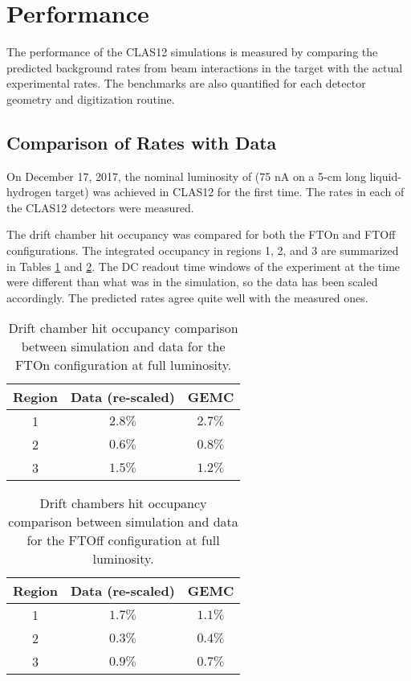 \section{Performance}

The performance of the CLAS12 simulations is measured by comparing the predicted background rates from beam interactions
in the target with the actual experimental rates. The benchmarks are also quantified for each detector geometry and digitization routine.

\subsection{Comparison of Rates with Data}
On December 17, 2017, the nominal luminosity of \cLuminosity
(75 nA on a 5-cm long liquid-hydrogen target) was achieved in CLAS12 for the first time.
The rates in each of the CLAS12 detectors were measured.

The drift chamber hit occupancy was compared for both the FTOn and FTOff configurations. The integrated occupancy
in regions 1, 2, and 3 are summarized in Tables \ref{tab:ftOnComparison} and \ref{tab:ftOffComparison}. The
DC readout time windows of the experiment at the time were different than what was in the simulation, so the data has been scaled
accordingly. The predicted rates agree quite well with the measured ones.

\begin{table}[h]
	\begin{center}
		\begin{tabular}{| c | c | c |}
			\hline \hline
			Region & Data (re-scaled) &  GEMC \\
			\hline
			1 &  $2.8\%$  & $2.7\%$ \\
			2 &  $0.6\%$  & $0.8\%$ \\
			3 &  $1.5\%$  & $1.2\%$ \\
		\hline \hline
		\end{tabular}
	\end{center}
	\caption{Drift chamber hit occupancy comparison between simulation and data for the FTOn configuration at full luminosity.}\label{tab:ftOnComparison}
\end{table}

\begin{table}[h]
	\begin{center}
		\begin{tabular}{| c | c | c |}
			\hline \hline
			Region & Data (re-scaled) &  GEMC \\
			\hline
			1 &  $1.7\%$  & $1.1\%$ \\
			2 &  $0.3\%$  & $0.4\%$ \\
			3 &  $0.9\%$  & $0.7\%$ \\
		\hline \hline
		\end{tabular}
	\end{center}
	\caption{Drift chambers hit occupancy comparison between simulation and data for the FTOff configuration at full luminosity.}\label{tab:ftOffComparison}
\end{table}



